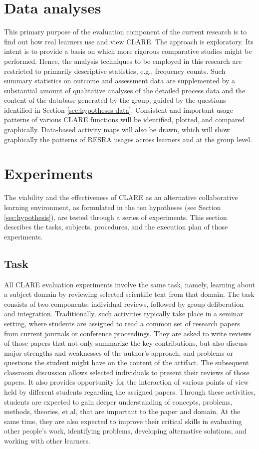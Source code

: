 \section{Data analyses}
\label{sec:data analysis}

This primary purpose of the evaluation component of the current research is
to find out how real learners use and view CLARE. The approach is
exploratory. Its intent is to provide a basis on which more rigorous
comparative studies might be performed. Hence, the analysis techniques to
be employed in this research are restricted to primarily descriptive
statistics, e.g., frequency counts.  Such summary statistics on outcome and
assessment data are supplemented by a substantial amount of qualitative
analyses of the detailed process data and the content of the database
generated by the group, guided by the questions identified in Section
\ref{sec:hypotheses data}. Consistent and important usage patterns of
various CLARE functions will be identified, plotted, and compared
graphically. Data-based activity maps will also be drawn, which will show
graphically the patterns of RESRA usages across learners and at the group
level.

\section{Experiments}
\label{sec:experiments}

The viability and the effectiveness of CLARE as an alternative
collaborative learning environment, as formulated in the ten hypotheses
(see Section \ref{sec:hypothesis}), are tested through a series of
experiments. This section describes the tasks, subjects, procedures, and
the execution plan of those experiments.

\subsection{Task}

All CLARE evaluation experiments involve the same task, namely, learning
about a subject domain by reviewing selected scientific text from that
domain. The task consists of two components: individual reviews, followed
by group deliberation and integration. Traditionally, such activities
typically take place in a seminar setting, where students are assigned to
read a common set of research papers from current journals or conference
proceedings. They are asked to write reviews of those papers that not only
summarize the key contributions, but also discuss major strengths and
weaknesses of the author's approach, and problems or questions the student
might have on the content of the artifact. The subsequent classroom
discussion allows selected individuals to present their reviews of those
papers. It also provides opportunity for the interaction of various points
of view held by different students regarding the assigned papers.  Through
these activities, students are expected to gain deeper understanding of
concepts, problems, methods, theories, et al, that are important to the
paper and domain.  At the same time, they are also expected to improve
their critical skills in evaluating other people's work, identifying
problems, developing alternative solutions, and working with other
learners.

